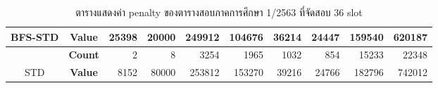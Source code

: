 \begin{table}[]
{\begin{tabular}{@{}ccrrrrrrrr@{}}
    \multirow{-2}{*}{BFS-STD}                    & \textbf{Value}                        & 25398                          & 20000                          & 249912                         & 104676                         & 36214                          & 24447                          & 159540                         & 620187                           \\ \midrule
                                                  & {\textbf{Count}} & {2}       & {8}       & {3254}    & {1965}    & {1032}    & {854}     & {15233}   & {22348}     \\ \cmidrule(l){2-10} 
    \multirow{-2}{*}{STD} & {\textbf{Value}} & {8152}    & {80000}   & {253812}  & {153270}  & {39216}   & {24766}   & {182796}  & {742012}    \\ \bottomrule
    \end{tabular}%
    }
    \caption{ตารางแสดงค่า penalty ของตารางสอบภาคการศึกษา 1/2563 ที่จัดสอบ 36 slot}
    \label{tab:result_table_163_36}
\end{table}
